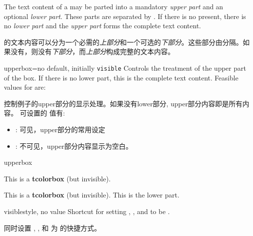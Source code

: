 The text content of a  may be parted into a mandatory \emph{upper part}
and an optional \emph{lower part}. These parts are separated by
. If there is no  present, there is no
\emph{lower part} and the \emph{upper part} forms the complete text content.


 的文本内容可以分为一个必需的\emph{上部分}和一个可选的\emph{下部分}。这些部分由分隔。如果没有，则没有\emph{下部分}，而\emph{上部分}构成完整的文本内容。

\begin{docTcbKey}[][doc new=2015-01-06]{upperbox}{=}{no default, initially \texttt{visible}}
Controls the treatment of the upper part of the box. If there is no lower part,  this is the complete text content.
Feasible values for  are:

控制例子的upper部分的显示处理。如果没有lower部分, upper部分内容即是所有内容。
可设置的  值有:
\begin{itemize}
\item{}:%
可见，upper部分的常用设定
\item{}: %
不可见，upper部分内容显示为空白。
\end{itemize}
\begin{exdispExample}{upperbox}
\begin{tcolorbox}[upperbox=invisible,colback=white%
,title=upperbox设置为invisible且没有lower部分]
This is a \textbf{tcolorbox} (but invisible).
\end{tcolorbox}

\begin{tcolorbox}[upperbox=invisible,colback=white%
,title=upperbox设置为invisible时只显示lower部分]
This is a \textbf{tcolorbox} (but invisible).
\tcblower
This is the lower part.
\end{tcolorbox}
\end{exdispExample}
\end{docTcbKey}


\begin{docTcbKey}[][doc new and updated={2015-01-06}{2019-03-01}]{visible}{}{style, no value}
Shortcut for setting , , and 
to be .

同时设置 , , 和  为  的快捷方式。
\end{docTcbKey}

